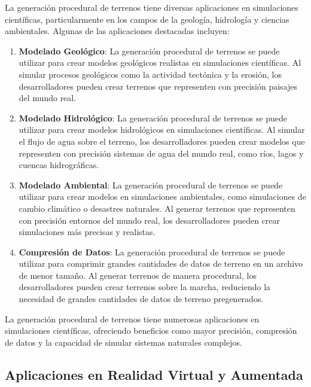 La generación procedural de terrenos tiene diversas aplicaciones en simulaciones científicas, particularmente en los campos de la geología, hidrología y ciencias ambientales. Algunas de las aplicaciones destacadas incluyen:

\begin{enumerate}
    \item \textbf{Modelado Geológico}: La generación procedural de terrenos se puede utilizar para crear modelos geológicos realistas en simulaciones científicas. Al simular procesos geológicos como la actividad tectónica y la erosión, los desarrolladores pueden crear terrenos que representen con precisión paisajes del mundo real\cite{GeologicalModeling}.
    
    \item \textbf{Modelado Hidrológico}: La generación procedural de terrenos se puede utilizar para crear modelos hidrológicos en simulaciones científicas. Al simular el flujo de agua sobre el terreno, los desarrolladores pueden crear modelos que representen con precisión sistemas de agua del mundo real, como ríos, lagos y cuencas hidrográficas\cite{HydrologicalModeling}.
    
    \item \textbf{Modelado Ambiental}: La generación procedural de terrenos se puede utilizar para crear modelos en simulaciones ambientales, como simulaciones de cambio climático o desastres naturales. Al generar terrenos que representen con precisión entornos del mundo real, los desarrolladores pueden crear simulaciones más precisas y realistas\cite{EnvironmentalModeling}.
    
    \item \textbf{Compresión de Datos}: La generación procedural de terrenos se puede utilizar para comprimir grandes cantidades de datos de terreno en un archivo de menor tamaño. Al generar terrenos de manera procedural, los desarrolladores pueden crear terrenos sobre la marcha, reduciendo la necesidad de grandes cantidades de datos de terreno pregenerados\cite{DataCompression}.
\end{enumerate}

La generación procedural de terrenos tiene numerosas aplicaciones en simulaciones científicas, ofreciendo beneficios como mayor precisión, compresión de datos y la capacidad de simular sistemas naturales complejos.

\subsection{Aplicaciones en Realidad Virtual y Aumentada}

